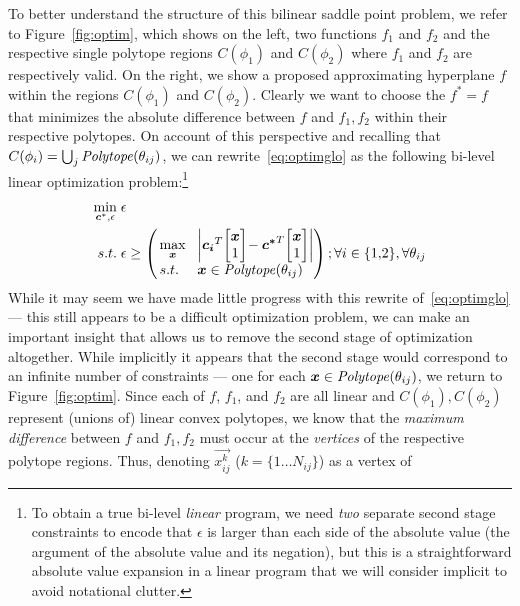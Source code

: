 To better understand the structure of this bilinear saddle point
problem, we refer to Figure~\ref{fig:optim}, which shows on the
left, two functions $f_1$ and $f_2$ and the respective single polytope
regions $C(\phi_1)$ and $C(\phi_2)$ where $f_1$ and $f_2$ are
respectively valid.  On the right, we show a proposed approximating
hyperplane $f$ within the regions $C(\phi_1)$ and $C(\phi_2)$.
Clearly we want to choose the $f^*=f$ that minimizes the absolute
difference between $f$ and $f_1,f_2$ within their respective polytopes.
On account of this perspective and recalling that $C(\phi_i)
= \bigcup_j \mathit{Polytope}(\theta_{ij})$, we can rewrite~\eqref{eq:optimglo} as
the following bi-level linear optimization problem:\footnote{
To obtain a true bi-level \emph{linear} program, we need \emph{two} separate
second stage constraints to encode that $\epsilon$ is larger than each
side of the absolute value (the argument of the absolute value and its
negation), but this is a straightforward absolute value expansion in a
linear program that we will consider implicit to avoid notational clutter.}
\begin{align}
\min_{\vec{c}^*,\epsilon} \; & \epsilon \label{eq:bilevel} \\
s.t. \;       & \epsilon \geq \left( \!\!
  \begin{array}{ll}
  \max\limits_{\vec{x}} \! & \left| \vec{c_i}^T \! \mb \vec{x}\\1 \me \! - \vec{c^*}^T \! \mb \vec{x}\\1 \me \right| \\ 
  s.t. \;              \! & \vec{x} \in \PT(\theta_{ij})
  \end{array} \!\!\! \right); \forall i \in \{ 1,\!2 \}, \forall \theta_{ij} \nonumber
\end{align}
While it may seem we have made little progress with this rewrite
of~\eqref{eq:optimglo} --- this still appears to be a difficult
optimization problem, we can make an important insight that allows
us to remove the second stage of optimization altogether.  While
implicitly it appears that the second stage would correspond to an
infinite number of constraints --- one for each
$\boldsymbol{x} \in \mathit{Polytope}(\theta_{ij})$, we return to Figure~\ref{fig:optim}.
Since each of $f$, $f_1$, and $f_2$ are all linear and
$C(\phi_1),C(\phi_2)$ represent (unions of) linear convex polytopes,
we know that the \emph{maximum difference} between $f$ and $f_1,f_2$ must
occur at the \emph{vertices} of the respective polytope regions.
Thus, denoting $\vec{x_{ij}^k}$ ($k = \{ 1 \ldots N_{ij} \}$) as a vertex of
